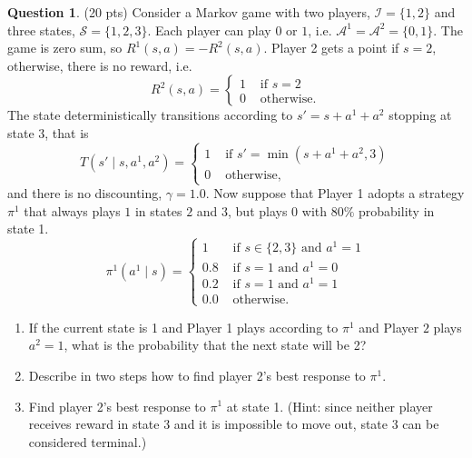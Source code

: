 \documentclass{article}
\theoremstyle{definition}
\newtheorem{question}[thm]{Question}
\begin{document}
\begin{question} (20 pts)
    Consider a Markov game with two players, $\mathcal{I}=\{1,2\}$ and three states, $\mathcal{S}=\{1,2,3\}$. Each player can play $0$ or $1$, i.e. $\mathcal{A}^1 = \mathcal{A}^2 = \{0,1\}$. The game is zero sum, so $R^1(s, a) = -R^2(s, a)$. Player 2 gets a point if $s=2$, otherwise, there is no reward, i.e.
    \begin{equation}
        R^2(s, a) = \begin{cases}
            1 &\text{ if } s = 2 \\
            0 &\text{ otherwise.}
        \end{cases}
    \end{equation}
    The state deterministically transitions according to $s' = s + a^1 + a^2$ stopping at state $3$, that is
    \begin{equation}
        T(s' \mid s, a^1, a^2) = \begin{cases}
            1 &\text{ if } s' = \min(s + a^1 + a^2, 3) \\
            0 &\text{ otherwise,}
        \end{cases}
    \end{equation}
    and there is no discounting, $\gamma = 1.0$.
    Now suppose that Player 1 adopts a strategy $\pi^1$ that always plays $1$ in states $2$ and $3$, but plays 0 with $80\%$ probability in state 1.
    \begin{equation}
        \pi^1(a^1 \mid s) = \begin{cases}
            1 &\text{ if } s \in \{2, 3\} \text{ and } a^1 = 1 \\
            0.8 & \text{ if } s = 1 \text{ and } a^1 = 0 \\
            0.2 & \text{ if } s = 1 \text{ and } a^1 = 1 \\
            0.0 & \text{ otherwise.}
        \end{cases}
    \end{equation}
    \begin{enumerate}[label=\alph*)]
        \item If the current state is 1 and Player 1 plays according to $\pi^1$ and Player $2$ plays $a^2=1$, what is the probability that the next state will be 2?
        \item Describe in two steps how to find player 2's best response to $\pi^1$.
        \item Find player 2's best response to $\pi^1$ at state 1. (Hint: since neither player receives reward in state 3 and it is impossible to move out, state 3 can be considered terminal.)
    \end{enumerate}
\end{question}
\end{document}
